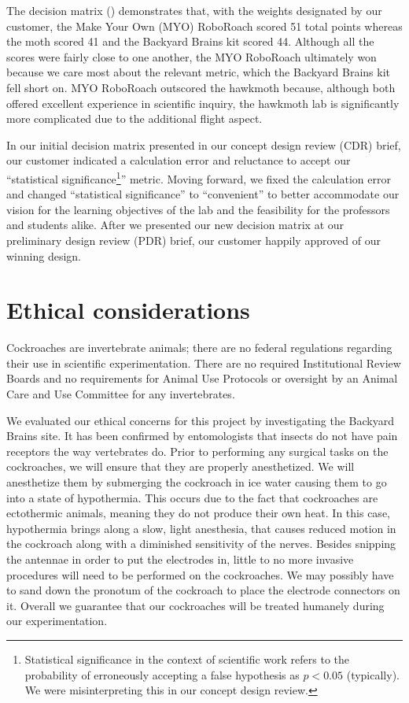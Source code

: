 \documentclass[twocolumn,10pt]{IEEEtran}
\begin{document}
The decision matrix () demonstrates that, with the weights designated by our customer, the Make Your Own (MYO) RoboRoach scored 51 total points whereas the moth scored 41 and the Backyard Brains kit scored 44. Although all the scores were fairly close to one another, the MYO RoboRoach ultimately won because we care most about the relevant metric, which the Backyard Brains kit fell short on. MYO RoboRoach outscored the hawkmoth because, although both offered excellent experience in scientific inquiry, the hawkmoth lab is significantly more complicated due to the additional flight aspect.

In our initial decision matrix presented in our concept design review (CDR) brief, our customer indicated a calculation error and reluctance to accept our ``statistical significance\footnote{Statistical significance in the context of scientific work refers to the probability of erroneously accepting a false hypothesis as $p<0.05$ (typically). We were misinterpreting this in our concept design review.}'' metric. Moving forward, we fixed the calculation error and changed ``statistical significance'' to ``convenient'' to better accommodate our vision for the learning objectives of the lab and the feasibility for the professors and students alike. After we presented our new decision matrix at our preliminary design review (PDR) brief, our customer happily approved of our winning design.

\section{Ethical considerations}
Cockroaches are invertebrate animals; there are no federal regulations regarding their use in scientific experimentation. There are no required Institutional Review Boards and no requirements for Animal Use Protocols or oversight by an Animal Care and Use Committee for any invertebrates.

We evaluated our ethical concerns for this project by investigating the Backyard Brains site. It has been confirmed by entomologists that insects do not have pain receptors the way vertebrates do. Prior to performing any surgical tasks on the cockroaches, we will ensure that they are properly anesthetized. We will anesthetize them by submerging the cockroach in ice water causing them to go into a state of hypothermia. This occurs due to the fact that cockroaches are ectothermic animals, meaning they do not produce their own heat. In this case, hypothermia brings along a slow, light anesthesia, that causes reduced motion in the cockroach along with a diminished sensitivity of the nerves. Besides snipping the antennae in order to put the electrodes in, little to no more invasive procedures will need to be performed on the cockroaches. We may possibly have to sand down the pronotum of the cockroach to place the electrode connectors on it. Overall we guarantee that our cockroaches will be treated humanely during our experimentation.
\end{document}

